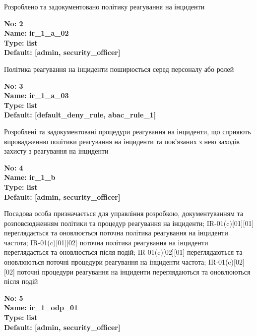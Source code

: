\documentclass{article}
\begin{document}
{\footnotesize Розроблено та задокументовано політику реагування на інциденти}


{\footnotesize\bfseries
No: 2\\
Name: ir\_\allowbreak{}1\_\allowbreak{}a\_\allowbreak{}02\\
Type: list\\
Default: [\textquotedbl{}admin\textquotedbl{}, \textquotedbl{}security\_\allowbreak{}officer\textquotedbl{}]
}

{\footnotesize Політика реагування на інциденти поширюється серед персоналу або ролей}


{\footnotesize\bfseries
No: 3\\
Name: ir\_\allowbreak{}1\_\allowbreak{}a\_\allowbreak{}03\\
Type: list\\
Default: [\textquotedbl{}default\_\allowbreak{}deny\_\allowbreak{}rule\textquotedbl{}, \textquotedbl{}abac\_\allowbreak{}rule\_\allowbreak{}1\textquotedbl{}]
}

{\footnotesize Розроблені та задокументовані процедури реагування на інциденти, що сприяють впровадженню політики реагування на інциденти та пов'язаних з нею заходів захисту з реагування на інциденти}


{\footnotesize\bfseries
No: 4\\
Name: ir\_\allowbreak{}1\_\allowbreak{}b\\
Type: list\\
Default: [\textquotedbl{}admin\textquotedbl{}, \textquotedbl{}security\_\allowbreak{}officer\textquotedbl{}]
}

{\footnotesize Посадова особа призначається для управління розробкою, документуванням та розповсюдженням політики та процедур реагування на інциденти; IR-01(c)[01][01] переглядається та оновлюється поточна політика реагування на інциденти частота; IR-01(c)[01][02] поточна політика реагування на інциденти переглядається та оновлюється після подій; IR-01(c)[02][01] переглядаються та оновлюються поточні процедури реагування на інциденти частота; IR-01(c)[02][02] поточні процедури реагування на інциденти переглядаються та оновлюються після подій}


{\footnotesize\bfseries
No: 5\\
Name: ir\_\allowbreak{}1\_\allowbreak{}odp\_\allowbreak{}01\\
Type: list\\
Default: [\textquotedbl{}admin\textquotedbl{}, \textquotedbl{}security\_\allowbreak{}officer\textquotedbl{}]
}
\end{document}
